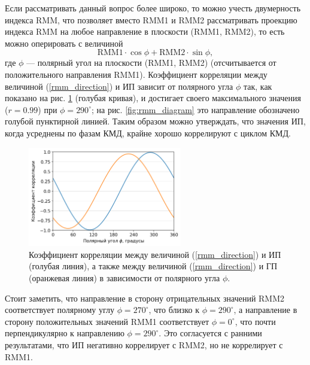 Если рассматривать данный вопрос более широко, то можно учесть двумерность индекса RMM, что позволяет вместо RMM1 и RMM2 рассматривать проекцию индекса RMM на любое направление в плоскости (RMM1, RMM2), то есть можно оперировать с величиной 
\begin{equation}\label{rmm_direction}
	\mathrm{RMM1}\cdot \cos\phi + \mathrm{RMM2}\cdot \sin\phi,
\end{equation}
где $\phi$ --- полярный угол на плоскости (RMM1, RMM2) (отсчитывается от положительного направления RMM1). Коэффициент корреляции между величиной (\ref{rmm_direction}) и ИП зависит от полярного угла $\phi$ так, как показано на рис. \ref{fig:r} (голубая кривая), и достигает своего максимального значения ($r=0.99$) при $\phi=290^\circ$; на рис. \ref{fig:rmm_diagram} это направление обозначено голубой пунктирной линией. Таким образом можно утверждать, что значения ИП, когда усреднены по фазам КМД, крайне хорошо коррелируют с циклом КМД.

\begin{figure}[htbp]
	\centering
	\includegraphics[width=0.6\textwidth]{figures/r.png}
	\caption{Коэффициент корреляции между величиной (\ref{rmm_direction}) и ИП (голубая линия), а также между величиной (\ref{rmm_direction}) и ГП (оранжевая линия) в зависимости от полярного угла $\phi$.}
	\label{fig:r}
\end{figure}

Стоит заметить, что направление в сторону отрицательных значений RMM2 соответствует полярному углу $\phi=270^\circ$, что близко к $\phi=290^\circ$, а направление в сторону положительных значений RMM1 соответствует $\phi=0^\circ$, что почти перпендикулярно к направлению $\phi=290^\circ$. Это согласуется с ранними результатами, что ИП негативно коррелирует с RMM2, но не коррелирует с RMM1.
